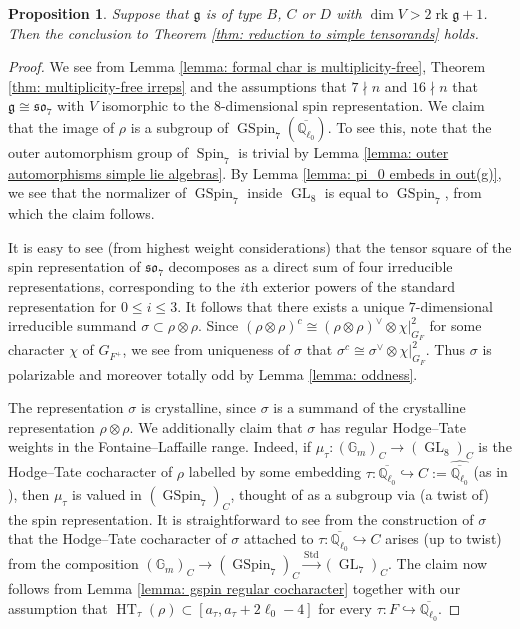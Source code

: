 \documentclass{amsart}
\newtheorem{proposition}[theorem]{Proposition}
\theoremstyle{definition}
\numberwithin{equation}{section} %
\newcommand{\GL}{\operatorname{GL}}
\newcommand{\GSpin}{\operatorname{GSpin}}
\newcommand{\solie}{\mathfrak{so}}
\newcommand{\rk}{\operatorname{rk}}
\newcommand{\Std}{\operatorname{Std}}
\newcommand{\Spin}{\operatorname{Spin}}
\newcommand{\Qlzerobar}{\ensuremath{\overline{\mathbb{Q}_{\ell_0}}}}
\newcommand{\HT}{\operatorname{HT}}
\newcommand{\mf}[1]{\mathfrak{#1}}
\begin{document}
\begin{proposition}\label{prop: so_7 spin rep}
Suppose that $\mf{g}$ is of type $B$, $C$ or $D$ with $\dim V > 2 \rk \mf{g} + 1$.
Then the conclusion to Theorem \ref{thm: reduction to simple tensorands} holds.
\end{proposition}
\begin{proof}
We see from Lemma \ref{lemma: formal char is multiplicity-free}, Theorem \ref{thm: multiplicity-free irreps} and the assumptions that $7 \nmid n$ and $16 \nmid n$ that $\mf{g} \cong \solie_7$ with $V$ isomorphic to the $8$-dimensional spin representation.
We claim that the image of $\rho$ is a subgroup of $\GSpin_7(\Qlzerobar)$.
To see this, note that the outer automorphism group of $\Spin_7$ is trivial by Lemma \ref{lemma: outer automorphisms simple lie algebras}.
By Lemma \ref{lemma: pi_0 embeds in out(g)}, we see that the normalizer of $\GSpin_7$ inside $\GL_8$ is equal to $\GSpin_7$, from which the claim follows.

It is easy to see (from highest weight considerations) that the tensor square of the spin representation of $\solie_7$ decomposes as a direct sum of four irreducible representations, corresponding to the $i$th exterior powers of the standard representation for $0 \leq i \leq 3$.
It follows that there exists a unique $7$-dimensional irreducible summand $\sigma \subset \rho \otimes \rho$.
Since $(\rho \otimes \rho)^c \cong (\rho \otimes \rho)^\vee \otimes \chi|_{G_F}^2$ for some character $\chi$ of $G_{F^+}$, we see from uniqueness of $\sigma$ that $\sigma^c \cong \sigma^\vee \otimes \chi|_{G_F}^2$.
Thus $\sigma$ is polarizable and moreover totally odd by Lemma \ref{lemma: oddness}.

The representation $\sigma$ is crystalline, since $\sigma$ is a summand of the crystalline representation $\rho \otimes \rho$.
We additionally claim that $\sigma$ has regular Hodge--Tate weights in the Fontaine--Laffaille range.
Indeed, if $\mu_\tau: (\mathbb{G}_m)_C \to (\GL_8)_C$ is the Hodge--Tate cocharacter of $\rho$ labelled by some embedding $\tau: \Qlzerobar \hookrightarrow C := \widehat{\Qlzerobar}$ (as in \cite[2.4]{buzzardgee}), then $\mu_\tau$ is valued in $(\GSpin_7)_C$, thought of as a subgroup via (a twist of) the spin representation.
It is straightforward to see from the construction of $\sigma$ that the Hodge--Tate cocharacter of $\sigma$ attached to $\tau: \Qlzerobar \hookrightarrow C$ arises (up to twist) from the composition $(\mathbb{G}_m)_C \to (\GSpin_7)_C \xrightarrow{\Std} (\GL_7)_C$.
The claim now follows from Lemma \ref{lemma: gspin regular cocharacter} together with our assumption that $\HT_\tau(\rho) \subset [a_\tau, a_\tau + 2 \ell_0 - 4]$ for every $\tau: F \hookrightarrow \Qlzerobar$.


\end{proof}
\end{document}
